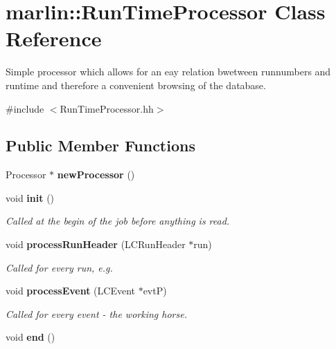 \section{marlin::RunTimeProcessor Class Reference}
\label{classmarlin_1_1RunTimeProcessor}


Simple processor which allows for an eay relation bwetween runnumbers and runtime and therefore a convenient browsing of the database.  


{\ttfamily \#include $<$RunTimeProcessor.hh$>$}\subsection*{Public Member Functions}
\begin{DoxyCompactItemize}
\item 
Processor $\ast$ {\bfseries newProcessor} ()\label{classmarlin_1_1RunTimeProcessor_abb4e168d5fbedd389700c6a49d3cda16}

\item 
void {\bf init} ()
\begin{DoxyCompactList}\small\item\em Called at the begin of the job before anything is read. \item\end{DoxyCompactList}\item 
void {\bf processRunHeader} (LCRunHeader $\ast$run)
\begin{DoxyCompactList}\small\item\em Called for every run, e.g. \item\end{DoxyCompactList}\item 
void {\bf processEvent} (LCEvent $\ast$evtP)
\begin{DoxyCompactList}\small\item\em Called for every event -\/ the working horse. \item\end{DoxyCompactList}\item 
void {\bfseries end} ()\label{classmarlin_1_1RunTimeProcessor_a67b683b9715712a534b86e365f551e5b}

\end{DoxyCompactItemize}
